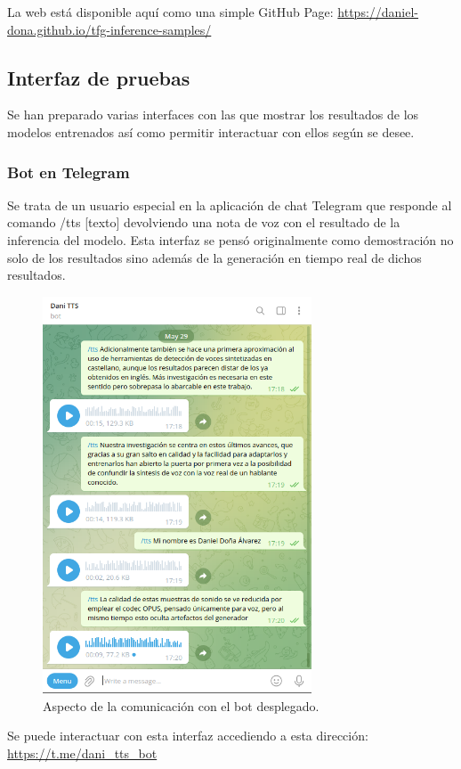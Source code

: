 La web está disponible aquí como una simple GitHub Page: \url{https://daniel-dona.github.io/tfg-inference-samples/}


\subsection{Interfaz de pruebas}

Se han preparado varias interfaces con las que mostrar los resultados de los modelos entrenados así como permitir interactuar con ellos según se desee.

\subsubsection{Bot en Telegram}

Se trata de un usuario especial en la aplicación de chat Telegram que responde al comando /tts [texto] devolviendo una nota de voz con el resultado de la inferencia del modelo. Esta interfaz se pensó originalmente como demostración no solo de los resultados sino además de la generación en tiempo real de dichos resultados.


\begin{figure}[h]
\centering
\includegraphics[width=8cm]{8_entregables_img/telegram_0.png}
\caption{Aspecto de la comunicación con el bot desplegado.}
\label{fig:figure1}
\end{figure}


Se puede interactuar con esta interfaz accediendo a esta dirección: \url{https://t.me/dani_tts_bot}

